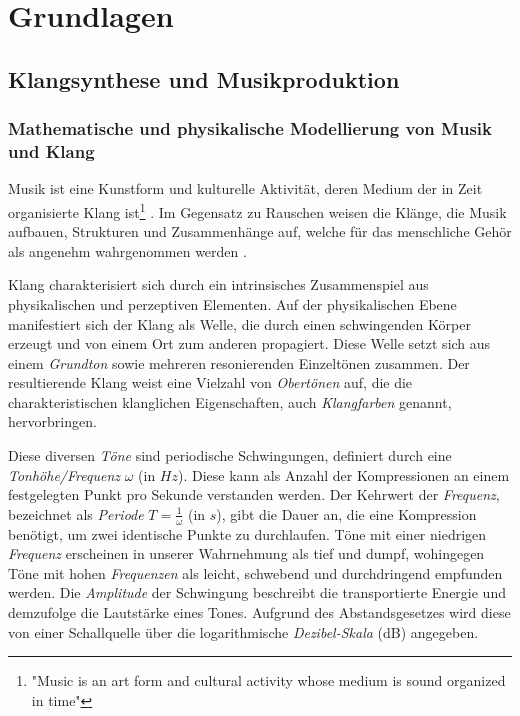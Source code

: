 \documentclass[
  a4paper,  %
  twoside,  %
  bibliography=totoc,
  headsepline,
  cleardoublepage=empty,
  parskip=half,
  draft=false
]{scrbook}
\begin{document}
\chapter{Grundlagen}

\section{Klangsynthese und Musikproduktion}

\subsection{Mathematische und physikalische Modellierung von Musik und Klang}\label{sec:music_math}
\glqq Musik ist eine Kunstform und kulturelle Aktivität, deren Medium der in Zeit organisierte Klang ist\grqq \footnote{"Music is an art form and cultural activity whose medium is sound organized in time"} \cite{tsuji_physics_2021}. Im Gegensatz zu Rauschen weisen die Klänge, die Musik aufbauen, Strukturen und Zusammenhänge auf, welche für das menschliche Gehör als angenehm wahrgenommen werden \cite{parker_good_2009}. 

Klang charakterisiert sich durch ein intrinsisches Zusammenspiel aus physikalischen und perzeptiven Elementen. Auf der physikalischen Ebene manifestiert sich der Klang als Welle, die durch einen schwingenden Körper erzeugt und von einem Ort zum anderen propagiert. Diese Welle setzt sich aus einem \emph{Grundton} sowie mehreren resonierenden Einzeltönen zusammen. Der resultierende Klang weist eine Vielzahl von \emph{Obertönen} auf, die die charakteristischen klanglichen Eigenschaften, auch \emph{Klangfarben} genannt, hervorbringen. \cite{tsuji_physics_2021, parker_good_2009}

Diese diversen \emph{Töne} sind periodische Schwingungen, definiert durch eine \emph{Tonhöhe/Frequenz} $\omega$ (in $Hz$). Diese kann als Anzahl der Kompressionen an einem festgelegten Punkt pro Sekunde verstanden werden. Der Kehrwert der \emph{Frequenz}, bezeichnet als \emph{Periode} $T=\frac{1}{\omega}$ (in $s$), gibt die Dauer an, die eine Kompression benötigt, um zwei identische Punkte zu durchlaufen. Töne mit einer niedrigen \emph{Frequenz} erscheinen in unserer Wahrnehmung als tief und dumpf, wohingegen Töne mit hohen \emph{Frequenzen} als leicht, schwebend und durchdringend empfunden werden. Die \emph{Amplitude} der Schwingung beschreibt die transportierte Energie und demzufolge die Lautstärke eines Tones. Aufgrund des Abstandsgesetzes wird diese von einer Schallquelle über die logarithmische \emph{Dezibel-Skala} (dB) angegeben. \cite{tsuji_physics_2021, parker_good_2009}
\end{document}
